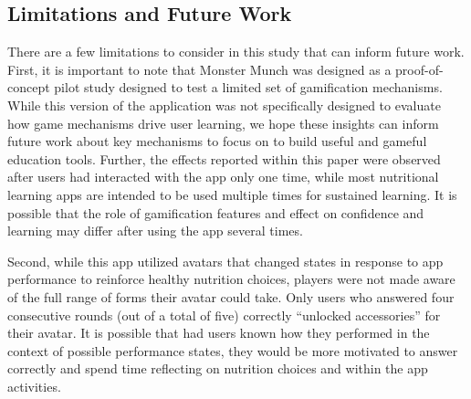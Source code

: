 


\vspace{-5pt}
\subsection{Limitations and Future Work}




There are a few limitations to consider in this study that can inform future work. First, it is important to note that Monster Munch was designed as a proof-of-concept pilot study designed to test a limited set of gamification mechanisms. While this version of the application was not specifically designed to evaluate how game mechanisms drive user learning, we hope these insights can inform future work about key mechanisms to focus on to build useful and gameful education tools. Further, the effects reported within this paper were observed after users had interacted with the app only one time, while most nutritional learning apps are intended to be used multiple times for sustained learning. It is possible that the role of gamification features and effect on confidence and learning may differ after using the app several times.

Second, while this app utilized avatars that changed states in response to app performance to reinforce healthy nutrition choices, players were not made aware of the full range of forms their avatar could take. Only users who answered four consecutive rounds (out of a total of five) correctly ``unlocked accessories'' for their avatar. It is possible that had users known how they performed in the context of possible performance states, they would be more motivated to answer correctly and spend time reflecting on nutrition choices and within the app activities. 

